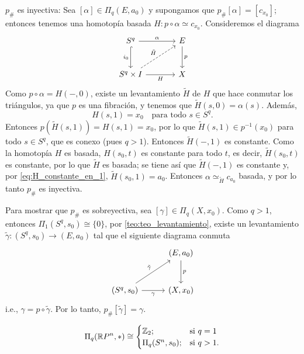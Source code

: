 \begin{dem}
$p_{\#}$ es inyectiva: Sea $[\alpha] \in \Pi_q(E, a_0)$ y supongamos que $p_{\#}[\alpha] = [c_{x_0}]$; entonces tenemos una homotopía basada $H \colon p \circ \alpha \simeq c_{x_0}$. Consideremos el diagrama
\[
\begin{tikzcd}[row sep=large, column sep=large]
S^q \arrow[r, "\alpha"] \arrow[d, "i_0"', hook] & E \arrow[d, "p"] \\
S^q \times I \arrow[r, "H"'] \arrow[ur, "\tilde{\vspace{0.5mm}H}", dashed] & X
\end{tikzcd}
\]
Como $p \circ \alpha = H(-, 0)$, existe un levantamiento $\tilde{H}$ de $H$ que hace conmutar los triángulos, ya que $p$ es una fibración, y tenemos que $\tilde{H}(s, 0) = \alpha(s)$. Además,
\begin{equation}\label{eq:H_constante_en_1}
H(s, 1) = x_0 \quad \text{para todo } s \in S^q.
\end{equation}
Entonces $p(\tilde{H}(s, 1)) = H(s, 1) = x_0$, por lo que $\tilde{H}(s, 1) \in p^{-1}(x_0)$ para todo $s \in S^q$, que es conexo (pues $q > 1$). Entonces $\tilde{H}(-, 1)$ es constante. Como la homotopía $H$ es basada, $H(s_0, t)$ es constante para todo $t$, es decir, $\tilde{H}(s_0, t)$ es constante, por lo que $\tilde{H}$ es basada; se tiene así que $\tilde{H}(-, 1)$ es constante y, por \eqref{eq:H_constante_en_1}, $\tilde{H}(s_0, 1) = a_0$. Entonces $\alpha \simeq_{\tilde{H}} c_{a_0}$ basada, y por lo tanto $p_{\#}$ es inyectiva.

Para mostrar que $p_\#$ es sobreyectiva, sea $[\gamma]\in \Pi_q(X,x_0)$. Como $q>1$, entonces $\Pi_1(S^q,s_0)\cong\{0\}$, por \ref{teo:teo_levantamiento}, existe un levantamiento $\tilde{\gamma}:(S^q,s_0)\to (E,a_0)$ tal que el siguiente diagrama conmuta 
\begin{equation*}
    \begin{tikzcd}[column sep= 1cm, row sep=1cm]
        & (E,a_0)\arrow[d,"p"]\\
        (S^q,s_0)\arrow[r,"\gamma"']\arrow[ur,"\tilde{\gamma}"] & (X,x_0)
    \end{tikzcd}
\end{equation*}
i.e., $\gamma=p\circ\tilde{\gamma}$. Por lo tanto, $p_\#[\tilde{\gamma}] =\gamma$.
\end{dem}
\begin{prop}
    \begin{equation*}
        \Pi_q(\mathbb{R} P^n,*)\cong\begin{cases}
            \mathbb{Z}_2; &\text{si } q=1\\
            \Pi_q(S^n,s_0); &\text{si } q>1.
        \end{cases}
    \end{equation*}
\end{prop}
